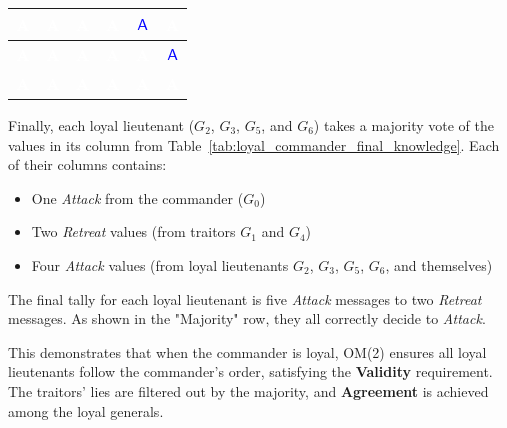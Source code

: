 \documentclass[11pt]{article}
\newcommand{\cmdA}{\ensuremath{\mathsf{A}}} %
\newcommand{\gen}[1]{\ensuremath{G_{#1}}}
\begin{document}
\begin{center}
\begin{tabular}{c|c|c|c|c|c}
    \hline
    \cellcolor{blue!75}\textbf{\textcolor{white}{A}} & \cellcolor{blue!75}\textbf{\textcolor{white}{A}} & \cellcolor{blue!75}\textbf{\textcolor{white}{A}} & \cellcolor{blue!75}\textbf{\textcolor{white}{A}} & \cellcolor{yellow!30}\textbf{\textcolor{blue}{\cmdA}} & \cellcolor{blue!75}\textbf{\textcolor{white}{A}} \\
    \hline
    \cellcolor{blue!75}\textbf{\textcolor{white}{A}} & \cellcolor{blue!75}\textbf{\textcolor{white}{A}} & \cellcolor{blue!75}\textbf{\textcolor{white}{A}} & \cellcolor{blue!75}\textbf{\textcolor{white}{A}} & \cellcolor{blue!75}\textbf{\textcolor{white}{A}} & \cellcolor{yellow!30}\textbf{\textcolor{blue}{\cmdA}} \\
    \hline
    \hline
    \cellcolor{blue!45}\textbf{\textcolor{white}{A}} & \cellcolor{blue!75}\textbf{\textcolor{white}{A}} & \cellcolor{blue!75}\textbf{\textcolor{white}{A}} & \cellcolor{blue!45}\textbf{\textcolor{white}{A}} & \cellcolor{blue!75}\textbf{\textcolor{white}{A}} & \cellcolor{blue!75}\textbf{\textcolor{white}{A}} \\
\end{tabular}
\label{tab:loyal_commander_final_knowledge}
\end{center}

\justifying
Finally, each loyal lieutenant ($\gen{2}$, $\gen{3}$, $\gen{5}$, and $\gen{6}$) takes a majority vote of the values in its column from Table~\ref{tab:loyal_commander_final_knowledge}. Each of their columns contains:
\begin{itemize}
    \item One \textit{Attack} from the commander ($\gen{0}$)
    \item Two \textit{Retreat} values (from traitors $\gen{1}$ and $\gen{4}$)
    \item Four \textit{Attack} values (from loyal lieutenants $\gen{2}$, $\gen{3}$, $\gen{5}$, $\gen{6}$, and themselves)
\end{itemize}
The final tally for each loyal lieutenant is five \textit{Attack} messages to two \textit{Retreat} messages. As shown in the "Majority" row, they all correctly decide to \textit{Attack}.

This demonstrates that when the commander is loyal, OM(2) ensures all loyal lieutenants follow the commander's order, satisfying the \textbf{Validity} requirement. The traitors' lies are filtered out by the majority, and \textbf{Agreement} is achieved among the loyal generals.
\end{document}
